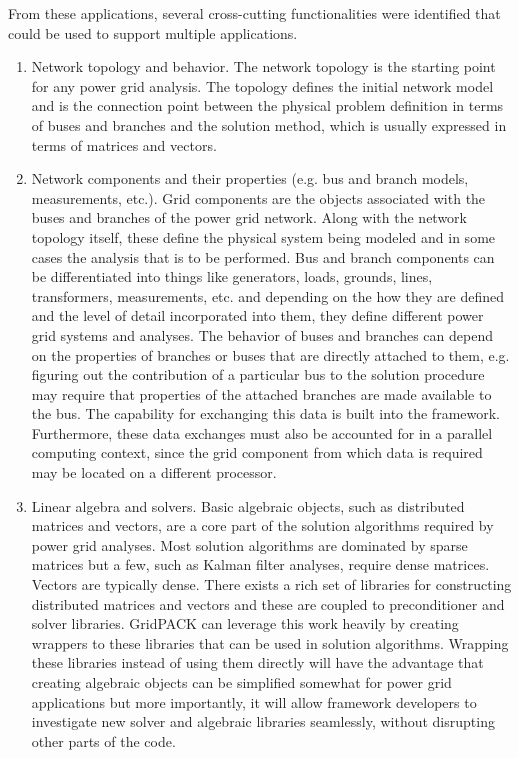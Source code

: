 From these applications, several cross-cutting functionalities were identified that could be used to support multiple applications.
\begin{enumerate}
\item  Network topology and behavior. The network topology is the starting point for any power grid analysis. The topology defines the initial network model and is the connection point between the physical problem definition in terms of buses and branches and the solution method, which is usually expressed in terms of matrices and vectors.

\item  Network components and their properties (e.g. bus and branch models, measurements, etc.). Grid components are the objects associated with the buses and branches of the power grid network. Along with the network topology itself, these define the physical system being modeled and in some cases the analysis that is to be performed. Bus and branch components can be differentiated into things like generators, loads, grounds, lines, transformers, measurements, etc.  and depending on the how they are defined and the level of detail incorporated into them, they define different power grid systems and analyses. The behavior of buses and branches can depend on the properties of branches or buses that are directly attached to them, e.g. figuring out the contribution of a particular bus to the solution procedure may require that properties of the attached branches are made available to the bus. The capability for exchanging this data is built into the framework. Furthermore, these data exchanges must also be accounted for in a parallel computing context, since the grid component from which data is required may be located on a different processor.

\item  Linear algebra and solvers. Basic algebraic objects, such as distributed matrices and vectors, are a core part of the solution algorithms required by power grid analyses. Most solution algorithms are dominated by sparse matrices but a few, such as Kalman filter analyses, require dense matrices. Vectors are typically dense. There exists a rich set of libraries for constructing distributed matrices and vectors and these are coupled to preconditioner and solver libraries. GridPACK can leverage this work heavily by creating wrappers to these libraries that can be used in solution algorithms. Wrapping these libraries instead of using them directly will have the advantage that creating algebraic objects can be simplified somewhat for power grid applications but more importantly, it will allow framework developers to investigate new solver and algebraic libraries seamlessly, without disrupting other parts of the code.


\end{enumerate}
